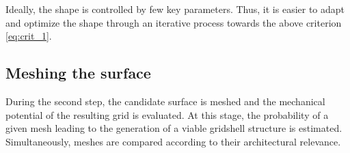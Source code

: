Ideally, the shape is controlled by few key parameters. Thus, it is easier to adapt and optimize the shape through an iterative process towards the above criterion \cref{eq:crit_1}.



\subsection{Meshing the surface}
During the second step, the candidate surface is meshed and the mechanical potential of the resulting grid is evaluated. At this stage, the probability of a given mesh leading to the generation of a viable gridshell structure is estimated. Simultaneously, meshes are compared according to their architectural relevance.


